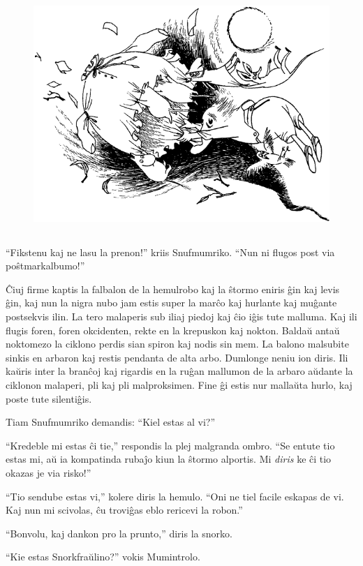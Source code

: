 \begin{figure}[htbp]
\centering
\includegraphics[width=350pt,height=255pt]{8-8.png}
\caption{}
\label{8-8}
\end{figure}

``Fikstenu kaj ne lasu la prenon!'' kriis Snufmumriko. ``Nun ni flugos post via poŝtmarkalbumo!''

Ĉiuj firme kaptis la falbalon de la hemulrobo kaj la ŝtormo eniris ĝin kaj levis ĝin, kaj nun la nigra nubo jam estis super la marĉo kaj hurlante kaj muĝante postsekvis ilin. La tero malaperis sub iliaj piedoj kaj ĉio iĝis tute malluma. Kaj ili flugis foren, foren okcidenten, rekte en la krepuskon kaj nokton.
\sectionbreak
Baldaŭ antaŭ noktomezo la ciklono perdis sian spiron kaj nodis sin mem. La balono malsubite sinkis en arbaron kaj restis pendanta de alta arbo. Dumlonge neniu ion diris. Ili kaŭris inter la branĉoj kaj rigardis en la ruĝan mallumon de la arbaro aŭdante la ciklonon malaperi, pli kaj pli malproksimen. Fine ĝi estis nur mallaŭta hurlo, kaj poste tute silentiĝis.

Tiam Snufmumriko demandis: ``Kiel estas al vi?''

``Kredeble mi estas ĉi tie,'' respondis la plej malgranda ombro. ``Se entute tio estas mi, aŭ ia kompatinda rubaĵo kiun la ŝtormo alportis. Mi \emph{diris} ke ĉi tio okazas je via risko!''

``Tio sendube estas vi,'' kolere diris la hemulo. ``Oni ne tiel facile eskapas de vi. Kaj nun mi scivolas, ĉu troviĝas eblo rericevi la robon.''

``Bonvolu, kaj dankon pro la prunto,'' diris la snorko.

``Kie estas Snorkfraŭlino?'' vokis Mumintrolo.

